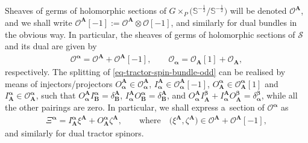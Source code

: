 \documentclass[10pt,a4paper]{amsart}
\numberwithin{equation}{section}
\newcommand{\mbf} [1]{\mathbf{#1}}
\newcommand{\mc} [1]{\mathcal{#1}}
\newcommand{\Ss} {\mathbb{S}}
\begin{document}
Sheaves of germs of holomorphic sections of $G \times_P \big( \Ss^{-\frac{1}{2}} / \Ss^{-\frac{1}{2}}\big)$ will be denoted $\mc{O}^{\mbf{A}}$, and we shall write $\mc{O}^{\mbf{A}} [-1]:= \mc{O}^{\mbf{A}} \otimes \mc{O} [-1]$, and similarly for dual bundles in the obvious way. In particular, the sheaves of germs of holomorphic sections of $\mc{S}$ and its dual are given by
\begin{gather}\label{eq-tractor-spin-bundle-odd}
\mc{O}^{\bm{\upalpha}} = \mc{O}^{\mbf{A}} + \mc{O}^{\mbf{A}} [-1] , \qquad
\mc{O}_{\bm{\upalpha}} = \mc{O}_{\mbf{A}} [1] + \mc{O}_{\mbf{A}} ,
\end{gather}
respectively. The splitting of \eqref{eq-tractor-spin-bundle-odd} can be realised by means of injectors/projectors $O_{\bm{\upalpha}}^{\mbf{A}} \in \mc{O}_{\bm{\upalpha}}^{\mbf{A}}$, $I_{\bm{\upalpha}}^{\mbf{A}} \in \mc{O}_{\bm{\upalpha}}^{\mbf{A}} [-1]$, $O^{\bm{\upalpha}}_{\mbf{A}} \in \mc{O}^{\bm{\upalpha}}_{\mbf{A}} [1]$ and $I^{\bm{\upalpha}}_{\mbf{A}} \in \mc{O}^{\bm{\upalpha}}_{\mbf{A}}$, such that $O_{\bm{\upalpha}}^{\mbf{A}} I^{\bm{\upalpha}}_{\mbf{B}} = \delta_{\mbf{B}}^{\mbf{A}}$, $I_{\bm{\upalpha}}^{\mbf{A}} O^{\bm{\upalpha}}_{\mbf{B}} = \delta_{\mbf{B}}^{\mbf{A}}$, and $O_{\bm{\upalpha}}^{\mbf{A}} I_{\mbf{A}}^{\bm{\upbeta}} + I_{\bm{\upalpha}}^{\mbf{A}} O_{\mbf{A}}^{\bm{\upbeta}} = \delta_{\bm{\upalpha}}^{\bm{\upbeta}}$, while all the other pairings are zero. In particular, we shall express a~section of $\mc{O}^{\bm{\upalpha}}$ as
\begin{gather*}
\Xi^{\bm{\upalpha}} = I^{\bm{\upalpha}}_{\mbf{A}} \xi^{\mbf{A}} + O^{\bm{\upalpha}}_{\mbf{A}} \zeta^{\mbf{A}} , \qquad \text{where} \quad \big(\xi^{\mbf{A}} , \zeta^{\mbf{A}}\big) \in \mc{O}^{\mbf{A}} + \mc{O}^{\mbf{A}} [-1],
\end{gather*}
and similarly for dual tractor spinors.
\end{document}
